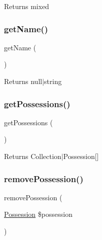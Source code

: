 \begin{DoxyReturn}{Returns}
mixed 
\end{DoxyReturn}
\mbox{\label{class_app_1_1_entity_1_1_possession_type_a3d0963e68bb313b163a73f2803c64600}} 
\subsubsection{\texorpdfstring{getName()}{getName()}}
{\footnotesize\ttfamily get\+Name (\begin{DoxyParamCaption}{ }\end{DoxyParamCaption})}

\begin{DoxyReturn}{Returns}
null$\vert$string 
\end{DoxyReturn}
\mbox{\label{class_app_1_1_entity_1_1_possession_type_ac4cac51c734a24a84655cd6294ff4afb}} 
\subsubsection{\texorpdfstring{getPossessions()}{getPossessions()}}
{\footnotesize\ttfamily get\+Possessions (\begin{DoxyParamCaption}{ }\end{DoxyParamCaption})}

\begin{DoxyReturn}{Returns}
Collection$\vert$\+Possession\mbox{[}\mbox{]} 
\end{DoxyReturn}
\mbox{\label{class_app_1_1_entity_1_1_possession_type_a720a2c7cb1ff271659d4ca746e29ca47}} 
\subsubsection{\texorpdfstring{removePossession()}{removePossession()}}
{\footnotesize\ttfamily remove\+Possession (\begin{DoxyParamCaption}\item[{\mbox{\hyperlink{class_app_1_1_entity_1_1_possession}{Possession}}}]{\$possession }\end{DoxyParamCaption})}


